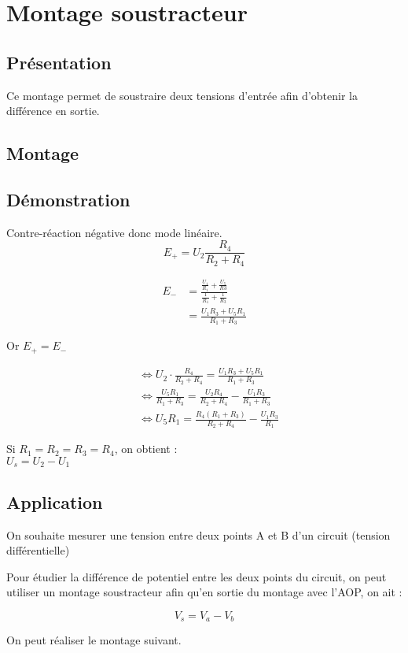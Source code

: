  \chapter{Montage soustracteur}
\section{Présentation}
Ce montage permet de soustraire deux tensions d’entrée afin d’obtenir la différence en sortie.

\section{Montage}


\section{Démonstration}


Contre-réaction négative donc mode linéaire.\\


$$E_+=U_2\frac{R_4}{R_2+R_4}$$

\begin{align}
E_-&=\frac{\frac{U_1}{R_1}+\frac{U_5}{R3}}{\frac{1}{R_1}+\frac{1}{R_3}}\\
&=\frac{U_1R_3+U_5R_1}{R_1+R_3}
\end{align}

Or $E_+=E_-$

\begin{align}
&\Leftrightarrow U_2 \cdot \frac{R_4}{R_2+R_4} = \frac{U_1R_3+U_5R_1}{R_1+R_3} \\
&\Leftrightarrow  \frac{U_5R_1}{R_1+R_3} = \frac{U_2R_4}{R_2+R_4} -\frac{U_1R_3}{R_1+R_3} \\
&\Leftrightarrow  U_5R_1 = \frac{R_4(R_1+R_3)}{R_2+R_4} - \frac{U_1R_3}{R_1} 
\end{align}


Si $R_1=R_2=R_3=R_4$, on obtient : \\

$U_s=U_2-U_1$\\

\section{Application}

\begin{exemple}
On souhaite mesurer une tension entre deux points A et B d’un circuit (tension différentielle)
\end{exemple}


Pour étudier la différence de potentiel entre les deux points du circuit, on peut utiliser un montage soustracteur 
afin qu’en sortie du montage avec l’AOP, on ait : 

$$ V_s=V_a-V_b$$

On peut réaliser le montage suivant.



